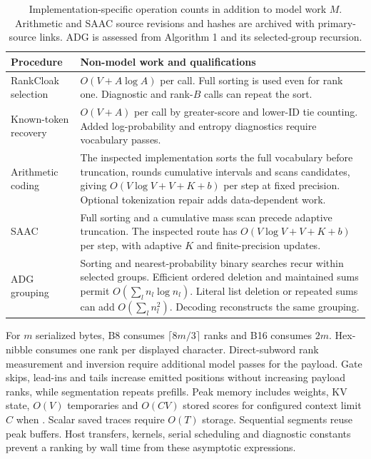 \begin{table}[H]\centering\small
\begin{tabularx}{\textwidth}{L{0.20\textwidth}Y}
\toprule
Procedure & Non-model work and qualifications \\
\midrule
RankCloak selection & \(O(V+A\log A)\) per call. Full sorting is used even for rank one. Diagnostic and rank-\(B\) calls can repeat the sort. \\
Known-token recovery & \(O(V+A)\) per call by greater-score and lower-ID tie counting. Added log-probability and entropy diagnostics require vocabulary passes. \\
Arithmetic coding & The inspected implementation sorts the full vocabulary before truncation, rounds cumulative intervals and scans candidates, giving \(O(V\log V+V+K+b)\) per step at fixed precision. Optional tokenization repair adds data-dependent work. \\
SAAC & Full sorting and a cumulative mass scan precede adaptive truncation. The inspected route has \(O(V\log V+V+K+b)\) per step, with adaptive \(K\) and finite-precision updates. \\
ADG grouping & Sorting and nearest-probability binary searches recur within selected groups. Efficient ordered deletion and maintained sums permit \(O(\sum_l n_l\log n_l)\). Literal list deletion or repeated sums can add \(O(\sum_l n_l^2)\). Decoding reconstructs the same grouping. \\
\bottomrule
\end{tabularx}
\caption{Implementation-specific operation counts in addition to model work \(M\). Arithmetic and SAAC source revisions and hashes are archived with primary-source links. ADG is assessed from Algorithm 1 and its selected-group recursion\cite{Ziegler2019NeuralLinguisticSteganography,Shen2020SelfAdjustingArithmetic,Zhang2021ProvablySecureGenerative}.}\label{tab:v4-complexity}
\end{table}

For \(m\) serialized bytes, B8 consumes \(\lceil8m/3\rceil\) ranks and B16 consumes \(2m\). Hex-nibble consumes one rank per displayed character. Direct-subword rank measurement and inversion require additional model passes for the payload. Gate skips, lead-ins and tails increase emitted positions without increasing payload ranks, while segmentation repeats prefills. Peak memory includes weights, KV state, \(O(V)\) temporaries and \(O(CV)\) stored scores for configured context limit \(C\) when . Scalar saved traces require \(O(T)\) storage. Sequential segments reuse peak buffers. Host transfers, kernels, serial scheduling and diagnostic constants prevent a ranking by wall time from these asymptotic expressions.
